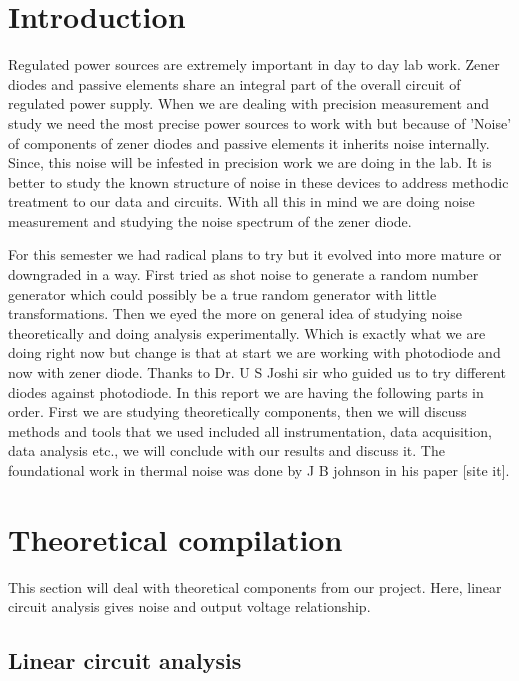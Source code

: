 \documentclass[12pt]{article}
\begin{document}

\section{Introduction}\label{introduction}
\vspace{20pt}
Regulated power sources are extremely important in day to day lab work. Zener diodes and passive elements share an integral part of the overall circuit of regulated power supply.  When we are dealing with precision measurement and study we need the most precise power sources to work with but because of 'Noise' of components of zener diodes and passive elements it inherits noise internally. Since, this noise will be infested in precision work we are doing in the lab. It is better to study the known structure of noise in these devices to address methodic treatment to our data and circuits. With all this in mind we are doing noise measurement and studying the noise spectrum of the zener diode.

For this semester we had radical plans to try but it evolved into more mature or downgraded in a way. First tried as shot noise to generate a random number generator which could possibly be a true random generator with little transformations. Then we eyed the more on general idea of studying noise theoretically and doing analysis experimentally. Which is exactly what we are doing right now but change is that at start we are working with photodiode and now with zener diode. Thanks to Dr. U S Joshi sir who guided us to try different diodes against photodiode. In this report we are having the following parts in order. First we are studying theoretically components, then we will discuss methods and tools that we used included all instrumentation, data acquisition, data analysis etc., we will conclude with our results and discuss it. The foundational work in thermal noise was done by J B johnson in his paper [site it]. 



\newpage
\section{Theoretical compilation}\label{Theory}

This section will deal with theoretical components from our project. Here, linear circuit analysis gives noise and output voltage relationship. 

\subsection{Linear circuit analysis \label{lca}}
\end{document}
